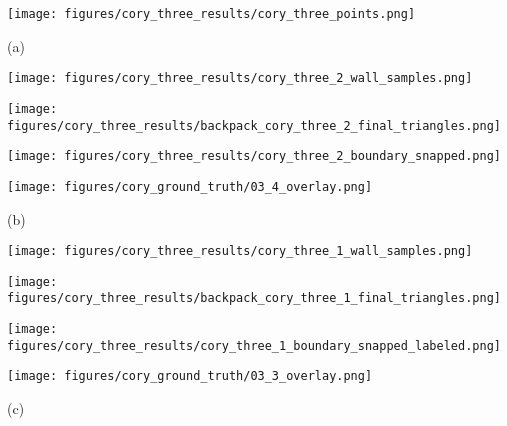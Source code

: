 \documentclass[10pt,twocolumn,letterpaper]{article}
\begin{document}
\begin{figure*}[t]

\begin{minipage}[b]{1.0\linewidth}
  \centering
  \centerline{\texttt{[image: figures/cory\_three\_results/cory\_three\_points.png]}}
\end{minipage}
\centerline{(a)}
\linebreak

\begin{minipage}[b]{0.24\linewidth}
  \centering
  \centerline{\texttt{[image: figures/cory\_three\_results/cory\_three\_2\_wall\_samples.png]}}
\end{minipage}
\hfill
\begin{minipage}[b]{0.24\linewidth}
  \centering
  \centerline{\texttt{[image: figures/cory\_three\_results/backpack\_cory\_three\_2\_final\_triangles.png]}}
\end{minipage}
\hfill
\begin{minipage}[b]{0.24\linewidth}
  \centering
  \centerline{\texttt{[image: figures/cory\_three\_results/cory\_three\_2\_boundary\_snapped.png]}}
\end{minipage}
\hfill
\begin{minipage}[b]{0.24\linewidth}
  \centering
  \centerline{\texttt{[image: figures/cory\_ground\_truth/03\_4\_overlay.png]}}
\end{minipage}
\centerline{(b)}
\linebreak

\begin{minipage}[b]{0.24\linewidth}
  \centering
  \centerline{\texttt{[image: figures/cory\_three\_results/cory\_three\_1\_wall\_samples.png]}}
\end{minipage}
\hfill
\begin{minipage}[b]{0.24\linewidth}
  \centering
  \centerline{\texttt{[image: figures/cory\_three\_results/backpack\_cory\_three\_1\_final\_triangles.png]}}
\end{minipage}
\hfill
\begin{minipage}[b]{0.24\linewidth}
  \centering
  \centerline{\texttt{[image: figures/cory\_three\_results/cory\_three\_1\_boundary\_snapped\_labeled.png]}}
\end{minipage}
\hfill
\begin{minipage}[b]{0.24\linewidth}
  \centering
  \centerline{\texttt{[image: figures/cory\_ground\_truth/03\_3\_overlay.png]}}
\end{minipage}
\centerline{(c)}
\linebreak


\end{figure*}
\end{document}
